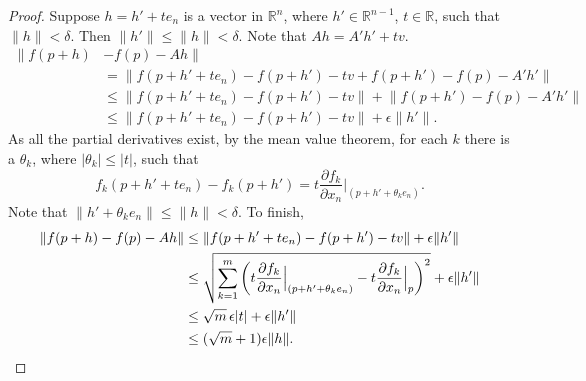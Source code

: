\documentclass[12pt,openany]{book}
\newcommand{\sabs}[1]{\lvert {#1} \rvert}
\newcommand{\snorm}[1]{\lVert {#1} \rVert}
\newcommand{\R}{{\mathbb{R}}}
\theoremstyle{plain}
\theoremstyle{remark}
\theoremstyle{definition}
\theoremstyle{exercise}
\theoremstyle{example}
\begin{document}
\begin{proof}
Suppose $h = h' + t e_n$ is a vector in $\R^n$, where $h' \in \R^{n-1}$,
$t \in \R$, such that
$\snorm{h} < \delta$.  Then $\snorm{h'} \leq \snorm{h} < \delta$.
Note that $Ah = A' h' + tv$.
\begin{equation*}
\begin{split}
\lVert f(p+h) &- f(p) - Ah \rVert
\\
& = \snorm{f(p+h' + t e_n) - f(p+h') - tv + f(p+h') - f(p) - A' h'}
\\
& \leq \snorm{f(p+h' + t e_n) - f(p+h') -tv} + \snorm{f(p+h') - f(p) -
A' h'}
\\
& \leq \snorm{f(p+h' + t e_n) - f(p+h') -tv} + \epsilon \snorm{h'} .
\end{split}
\end{equation*}
As all the partial derivatives exist, by the mean value theorem,
for each $k$ there is a $\theta_k$, where $\sabs{\theta_k} \leq \sabs{t}$, such that
\begin{equation*}
f_k(p+h' + t e_n) - f_k(p+h') =
t \frac{\partial f_k}{\partial x_n}\Big|_{(p+h'+\theta_k e_n)}.
\end{equation*}
Note that $\snorm{h'+\theta_k e_n} \leq \snorm{h} < \delta$.
To finish,
\begin{equation*}
\begin{split}
\snorm{f(p+h) - f(p) - Ah}
& \leq \snorm{f(p+h' + t e_n) - f(p+h') -tv} + \epsilon \snorm{h'}
\\
& \leq \sqrt{\sum_{k=1}^m
{\left(t\frac{\partial f_k}{\partial x_n}\Big|_{(p+h'+\theta_k e_n)} -
t \frac{\partial f_k}{\partial x_n}\Big|_{p}\right)}^2} + \epsilon \snorm{h'}
\\
& \leq \sqrt{m}\, \epsilon \sabs{t} + \epsilon \snorm{h'}
\\
& \leq (\sqrt{m}+1)\epsilon \snorm{h} . \qedhere
\end{split}
\end{equation*}
\end{proof}
\end{document}

